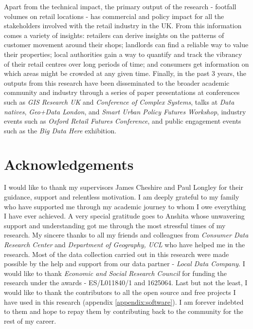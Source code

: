 Apart from the technical impact, the primary output of the research - footfall volumes on retail locations - has commercial and policy impact for all the stakeholders involved with the retail industry in the UK.
From this information comes a variety of insights: retailers can derive insights on the patterns of customer movement around their shops; landlords can find a reliable way to value their properties; local authorities gain a way to quantify and track the vibrancy of their retail centres over long periods of time; and consumers get information on which areas might be crowded at any given time.
Finally, in the past 3 years, the outputs from this research have been disseminated to the broader academic community and industry through a series of paper presentations at conferences such as \textit{GIS Research UK} and \textit{Conference of Complex Systems}, talks at \textit{Data natives}, \textit{Geo+Data London}, and \textit{Smart Urban Policy Futures Workshop}, industry events such as \textit{Oxford Retail Futures Conference}, and public engagement events such as the \textit{Big Data Here} exhibition.

\section*{Acknowledgements} 

I would like to thank my supervisors James Cheshire and Paul Longley for their guidance, support and relentless motivation.
I am deeply grateful to my family who have supported me through my academic journey to whom I owe everything I have ever achieved.
A very special gratitude goes to Anshita whose unwavering support and understanding got me through the most stressful times of my research.
My sincere thanks to all my friends and colleagues from \textit{Consumer Data Research Center} and \textit{Department of Geography, UCL} who have helped me in the research.
Most of the data collection carried out in this research were made possible by the help and support from our data partner - \textit{Local Data Company}.
I would like to thank \textit{Economic and Social Research Council} for funding the research under the awards - ES/L011840/1 and 1625064.
Last but not the least, I would like to thank the contributors to all the open source and free projects I have used in this research (appendix \ref{appendix:software}). I am forever indebted to them and hope to repay them by contributing back to the community for the rest of my career.
